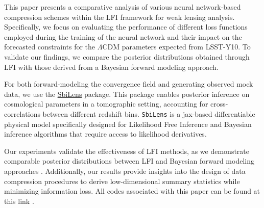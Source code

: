 \documentclass{aa}
\newcommand{\github}{\href{https://github.com/dlanzieri/WL_Implicit-Inference}{\faGithub}} %
\begin{document}
    {This paper presents a comparative analysis of various neural network-based compression schemes within the LFI framework for weak lensing analysis. Specifically, we focus on evaluating the performance of different loss functions employed during the training of the neural network and their impact on the forecasted constraints for the $\Lambda$CDM parameters expected from LSST-Y10. To validate our findings, we compare the posterior distributions obtained through LFI with those derived from a Bayesian forward modeling approach. }  
    {For both forward-modeling the convergence field and generating observed mock data, we use the \href{https://github.com/DifferentiableUniverseInitiative/sbi_lens}{\url{SbiLens}} package. 
    This package enables posterior inference on cosmological parameters in a tomographic setting, accounting for cross-correlations between different redshift bins. \texttt{SbiLens} is a jax-based differentiable physical model specifically designed for Likelihood Free Inference and Bayesian inference algorithms that require access to likelihood derivatives.
    
    }
   {Our experiments validate the effectiveness of LFI methods,  as we demonstrate comparable posterior distributions between LFI and Bayesian forward modeling approaches . Additionally, our results provide insights into the design of data compression procedures to derive low-dimensional summary statistics while minimizing information loss. All codes associated with this paper can be found at this link \github.}
   {}
\end{document}
